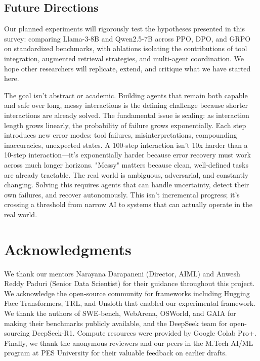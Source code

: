 \documentclass[12pt,a4paper]{report}
\theoremstyle{definition}
\begin{document}
\section*{Future Directions}

Our planned experiments will rigorously test the hypotheses presented in this survey: comparing Llama-3-8B and Qwen2.5-7B across PPO, DPO, and GRPO on standardized benchmarks, with ablations isolating the contributions of tool integration, augmented retrieval strategies, and multi-agent coordination.
 We hope other researchers will replicate, extend, and critique what we have started here.

The goal isn't abstract or academic. Building agents that remain both capable and safe over long, messy interactions is the defining challenge because shorter interactions are already solved. The fundamental issue is scaling: as interaction length grows linearly, the probability of failure grows exponentially. Each step introduces new error modes: tool failures, misinterpretations, compounding inaccuracies, unexpected states. A 100-step interaction isn't 10x harder than a 10-step interaction—it's exponentially harder because error recovery must work across much longer horizons. "Messy" matters because clean, well-defined tasks are already tractable. The real world is ambiguous, adversarial, and constantly changing. Solving this requires agents that can handle uncertainty, detect their own failures, and recover autonomously. This isn't incremental progress; it's crossing a threshold from narrow AI to systems that can actually operate in the real world.

\chapter*{Acknowledgments}

We thank our mentors Narayana Darapaneni (Director, AIML) and Anwesh Reddy Paduri (Senior Data Scientist) for their guidance throughout this project. We acknowledge the open-source community for frameworks including Hugging Face Transformers, TRL, and Unsloth that enabled our experimental framework. We thank the authors of SWE-bench, WebArena, OSWorld, and GAIA for making their benchmarks publicly available, and the DeepSeek team for open-sourcing DeepSeek-R1. Compute resources were provided by Google Colab Pro+. Finally, we thank the anonymous reviewers and our peers in the M.Tech AI/ML program at PES University for their valuable feedback on earlier drafts.
\end{document}

